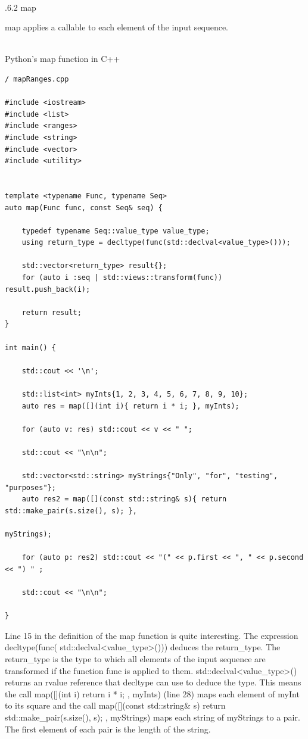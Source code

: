 \hspace*{\fill} \\ %
.6.2\hspace{0.2cm} map

map applies a callable to each element of the input sequence.

\hspace*{\fill} \\ %
\noindent
Python’s map function in C++
\begin{lstlisting}[style=styleCXX]
/ mapRanges.cpp

#include <iostream>
#include <list>
#include <ranges>
#include <string>
#include <vector>
#include <utility>


template <typename Func, typename Seq>
auto map(Func func, const Seq& seq) {

	typedef typename Seq::value_type value_type;
	using return_type = decltype(func(std::declval<value_type>()));
	
	std::vector<return_type> result{};
	for (auto i :seq | std::views::transform(func)) result.push_back(i);
	
	return result;
}

int main() {

	std::cout << '\n';
	
	std::list<int> myInts{1, 2, 3, 4, 5, 6, 7, 8, 9, 10};
	auto res = map([](int i){ return i * i; }, myInts);
	
	for (auto v: res) std::cout << v << " ";
	
	std::cout << "\n\n";
	
	std::vector<std::string> myStrings{"Only", "for", "testing", "purposes"};
	auto res2 = map([](const std::string& s){ return std::make_pair(s.size(), s); },
	                                                                myStrings);
	
	for (auto p: res2) std::cout << "(" << p.first << ", " << p.second << ") " ;
	
	std::cout << "\n\n";

}
\end{lstlisting}

Line 15 in the definition of the map function is quite interesting. The expression decltype(func( std::declval<value\_type>())) deduces the return\_type. The return\_type is the type to which all elements of the input sequence are transformed if the function func is applied to them. std::declval<value\_type>() returns an rvalue reference that decltype can use to deduce the type. This means the call map([](int i){ return i * i; }, myInts) (line 28) maps each element of myInt to its square and the call map([](const std::string\& s){ return std::make\_pair(s.size(), s); }, myStrings) maps each string of myStrings to a pair. The first element of each pair is the length of the string.

